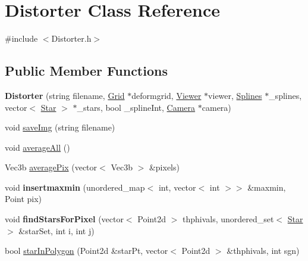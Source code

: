 \hypertarget{class_distorter}{}\section{Distorter Class Reference}
\label{class_distorter}


{\ttfamily \#include $<$Distorter.\+h$>$}

\subsection*{Public Member Functions}
\begin{DoxyCompactItemize}
\item 
\mbox{\label{class_distorter_a3908f862cc8e45359410d722cfb673b5}} 
{\bfseries Distorter} (string filename, \mbox{\hyperlink{class_grid}{Grid}} $\ast$deformgrid, \mbox{\hyperlink{class_viewer}{Viewer}} $\ast$viewer, \mbox{\hyperlink{class_splines}{Splines}} $\ast$\+\_\+splines, vector$<$ \mbox{\hyperlink{class_star}{Star}} $>$ $\ast$\+\_\+stars, bool \+\_\+spline\+Int, \mbox{\hyperlink{class_camera}{Camera}} $\ast$camera)
\item 
void \mbox{\hyperlink{class_distorter_a548e1ccce26b010601cafcdefbac5787}{save\+Img}} (string filename)
\item 
void \mbox{\hyperlink{class_distorter_ac4b35b33e2639646cd2c240d304636f1}{average\+All}} ()
\item 
Vec3b \mbox{\hyperlink{class_distorter_a7c6452da26a30ce0e4e385b4f055945d}{average\+Pix}} (vector$<$ Vec3b $>$ \&pixels)
\item 
\mbox{\label{class_distorter_a4aea9ae98d71bbcc4153751dc69a746a}} 
void {\bfseries insertmaxmin} (unordered\+\_\+map$<$ int, vector$<$ int $>$$>$ \&maxmin, Point pix)
\item 
\mbox{\label{class_distorter_a5cc1ef87d5e89e51f7f9303e18dc6474}} 
void {\bfseries find\+Stars\+For\+Pixel} (vector$<$ Point2d $>$ thphivals, unordered\+\_\+set$<$ \mbox{\hyperlink{class_star}{Star}} $>$ \&star\+Set, int i, int j)
\item 
bool \mbox{\hyperlink{class_distorter_a8b563e9c1625ffcac33e8e13469bb29b}{star\+In\+Polygon}} (Point2d \&star\+Pt, vector$<$ Point2d $>$ \&thphivals, int sgn)
\item 
\mbox{\label{class_distorter_afb65dac7fa50d4a7cc95ee6a310b0673}} 
$$
\end{DoxyCompactItemize}
